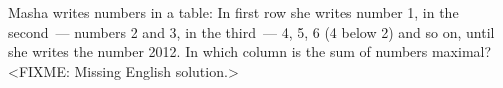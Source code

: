 \problem
Masha writes numbers in a table:
In first row she writes number 1, in the second~--- numbers 2 and 3, in the
third~--- 4, 5, 6 (4 below 2) and so on, until she writes the number 2012.
In which column is the sum of numbers maximal?
\solution
<FIXME: Missing English solution.>
\endproblem
